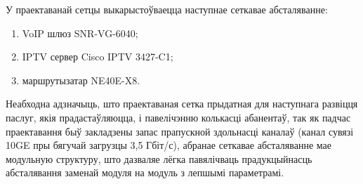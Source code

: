 У праектаванай сетцы выкарыстоўваецца наступнае сеткавае
абсталяванне:
\begin{enumerate}
    \item VoIP шлюз SNR-VG-6040;
    \item IPTV сервер Cisco IPTV 3427-C1;
    \item маршрутызатар NE40E-X8.
\end{enumerate}

Неабходна адзначыць, што праектаваная сетка прыдатная для
наступнага развіцця паслуг, якія прадастаўляюцца, і павелічэнню
колькасці абанентаў, так як падчас праектавання быў закладзены
запас прапускной здольнасці каналаў (канал сувязі 10GE пры бягучай
загрузцы 3,5 Гбіт/с), абранае сеткавае абсталяванне мае модульную
структуру, што дазваляе лёгка павялічваць прадукцыйнасць абсталявання
заменай модуля на модуль з лепшымі параметрамі.
